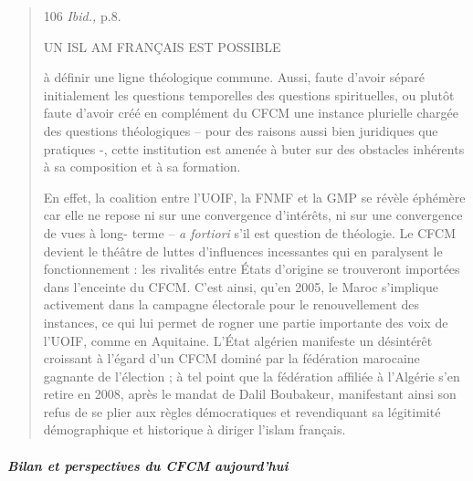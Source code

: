 \begin{quote}
106 \emph{Ibid.,} p.8.

UN ISL AM FRANÇAIS EST POSSIBLE

à définir une ligne théologique commune. Aussi, faute d'avoir séparé
initialement les questions temporelles des questions spirituelles, ou
plutôt faute d'avoir créé en complément du CFCM une instance plurielle
chargée des questions théologiques -- pour des raisons aussi bien
juridiques que pratiques -, cette institution est amenée à buter sur des
obstacles inhérents à sa composition et à sa formation.

En effet, la coalition entre l'UOIF, la FNMF et la GMP se révèle
éphémère car elle ne repose ni sur une convergence d'intérêts, ni sur
une convergence de vues à long- terme -- \emph{a fortiori} s'il est
question de théologie. Le CFCM devient le théâtre de luttes d'influences
incessantes qui en paralysent le fonctionnement : les rivalités entre
États d'origine se trouveront importées dans l'enceinte du CFCM. C'est
ainsi, qu'en 2005, le Maroc s'implique activement dans la campagne
électorale pour le renouvellement des instances, ce qui lui permet de
rogner une partie importante des voix de l'UOIF, comme en Aquitaine.
L'État algérien manifeste un désintérêt croissant à l'égard d'un CFCM
dominé par la fédération marocaine gagnante de l'élection ; à tel point
que la fédération affiliée à l'Algérie s'en retire en 2008, après le
mandat de Dalil Boubakeur, manifestant ainsi son refus de se plier aux
règles démocratiques et revendiquant sa légitimité démographique et
historique à diriger l'islam français.
\end{quote}

\hypertarget{bilan-et-perspectives-du-cfcm-aujourdhui}{%
\subparagraph{Bilan et perspectives du CFCM
aujourd'hui}\label{bilan-et-perspectives-du-cfcm-aujourdhui}}


